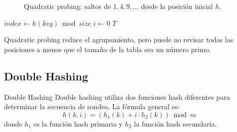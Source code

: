 \begin{figure}[htbp]
    \centering
    \caption{Quadratic probing: saltos de \(1, 4, 9, \ldots\) desde la posición inicial \(h\).}
    \label{fig:quadratic-probing}
\end{figure}

\begin{algorithm}[H]
\caption{Inserción con Quadratic Probing}
\label{alg:quadratic-probing-insert}
\(index \leftarrow h(key) \bmod size\)\;
\(i \leftarrow 0\)\;
\Return \(T\)\;
\end{algorithm}

\begin{observacion}
Quadratic probing reduce el agrupamiento, pero puede no revisar todas las posiciones a menos que el tamaño de la tabla sea un número primo.
\end{observacion}

\subsection{Double Hashing}
\label{subsec:double-hashing}

\begin{definicion}{Double Hashing}
Double hashing utiliza dos funciones hash diferentes para determinar la secuencia de sondeo. La fórmula general es:
\[
h(k, i) = (h_1(k) + i \cdot h_2(k)) \bmod m
\]
donde \(h_1\) es la función hash primaria y \(h_2\) la función hash secundaria.
\end{definicion}

